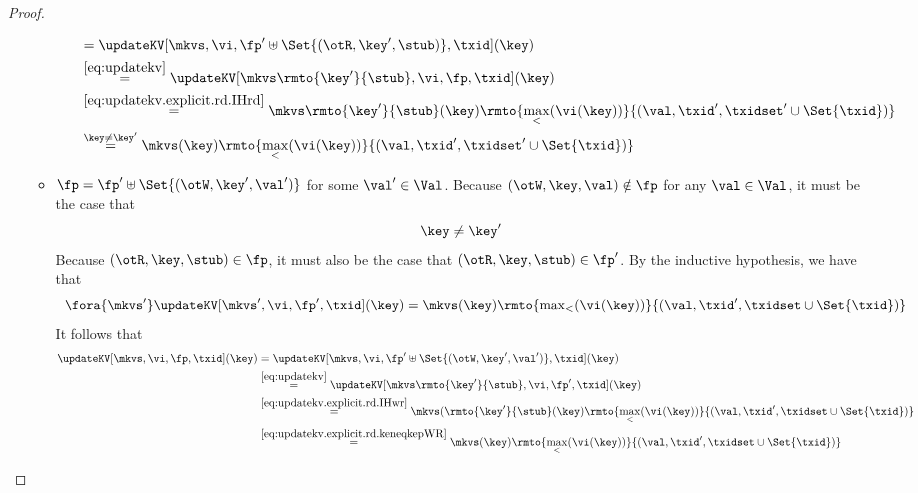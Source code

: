 \begin{proof}
\begin{enumerate}
\begin{itemize}
\begin{enumerate}
\begin{align*}
                & =
                \updateKV[\mkvs, \vi, \fp' \uplus \Set{(\otR, \key', \stub)}, \txid](\key) \\
                & \stackrel{\cref{eq:updatekv}}{=}
			    \updateKV[\mkvs\rmto{\key'}{\stub}, \vi, \fp, \txid](\key) \\
                & \stackrel{\cref{eq:updatekv.explicit.rd.IHrd}}{=} 
                \mkvs\rmto{\key'}{\stub}(\key)\rmto{\max_{<}(\vi(\key))}{(\val, \txid', \txidset' \cup \Set{\txid})} \\
                &\stackrel{\key \neq \key'}{=}
                \mkvs(\key)\rmto{\max_{<}(\vi(\key))}{(\val, \txid', \txidset' \cup \Set{\txid})}
			\end{align*}
		\end{enumerate}

		\item $\fp = \fp' \uplus \Set{(\otW, \key', \val')}$ for some $\val' \in \Val$. Because $(\otW, \key, \val) \notin \fp$ 
		for any $\val \in \Val$, it must be the case that 
		\begin{equation}
		\key \neq \key'
		\label{eq:updatekv.explicit.rd.keneqkepWR}
		\end{equation}
		Because $(\otR, \key, \stub) \in \fp$, it must also be the case that $(\otR, \key, \stub) \in \fp'$. By the inductive hypothesis, 
		we have that 
		\begin{equation}
		\label{eq:updatekv.explicit.rd.IHwr}
        \begin{array}{l}
        \fora{ \mkvs' }\updateKV[\mkvs', \vi, \fp', \txid](\key) 
        {} = \mkvs(\key)\rmto{\max_{<}(\vi(\key))}{(\val, \txid', \txidset \cup \Set{\txid})}
        \end{array}
		\end{equation}
		It follows that 
        \begin{align*}
		    \updateKV[\mkvs, \vi, \fp, \txid](\key) 
            & =
            \updateKV[\mkvs, \vi, \fp' \uplus \Set{(\otW, \key', \val')}, \txid](\key) \\
            & \stackrel{\cref{eq:updatekv}}{=}
		    \updateKV[\mkvs\rmto{\key'}{\stub}, \vi, \fp', \txid](\key) \\
            & \stackrel{\cref{eq:updatekv.explicit.rd.IHwr}}{=} 
            \mkvs(\rmto{\key'}{\stub}(\key)\rmto{\max_{<}(\vi(\key))}{(\val, \txid', \txidset \cup \Set{\txid})} \\
            & \stackrel{\cref{eq:updatekv.explicit.rd.keneqkepWR}}{=} 
            \mkvs(\key)\rmto{\max_{<}(\vi(\key))}{(\val, \txid', \txidset \cup \Set{\txid})}
        \end{align*}
	\end{itemize}
	

\end{enumerate}
\end{proof}
